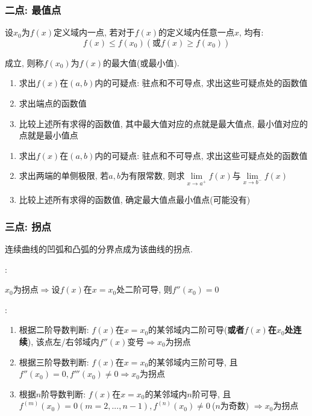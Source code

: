 \subsubsection{二点: 最值点}
设$ x_{0} $为$ f(x) $定义域内一点, 若对于$ f(x) $的定义域内任意一点$ x $, 均有:
\begin{equation*}
    f(x)\le f(x_{0})(\text{或}f(x)\ge f(x_{0}))
\end{equation*}\par
成立, 则称$ f(x_{0}) $为$ f(x) $的最大值(或最小值).\par \vspace{.5em}
\begin{enumerate}
    \item 求出$ f(x) $在$ (a,b) $内的可疑点: 驻点和不可导点, 求出这些可疑点处的函数值
    \item 求出端点的函数值
    \item 比较上述所有求得的函数值, 其中最大值对应的点就是最大值点, 最小值对应的点就是最小值点
\end{enumerate}
\begin{enumerate}
    \item 求出$ f(x) $在$ (a,b) $内的可疑点: 驻点和不可导点, 求出这些可疑点处的函数值
    \item 求出两端的单侧极限, 若$ a,b $为有限常数, 则求$ \lim\limits_{x\rightarrow a^{+}}f(x) $与$ \lim\limits_{x\rightarrow b^{-}}f(x) $
    \item 比较上述所有求得的函数值, 确定最大值点最小值点(可能没有)
\end{enumerate}
\subsubsection{三点: 拐点}
连续曲线的凹弧和凸弧的分界点成为该曲线的拐点.\par \vspace{.5em}
: \par \vspace{.5em}
$ x_{0} $为拐点$ \Rightarrow $设$ f(x) $在$ x=x_{0} $处二阶可导, 则$ f''(x_{0})=0 $ \par \vspace{.5em}
:
\begin{enumerate}
    \item 根据二阶导数判断: $ f(x) $在$ x=x_{0} $的某邻域内二阶可导(\textbf{或者$ f(x) $在$ x_{0} $处连续}), 该点左/右邻域内$ f''(x) $变号$ \Rightarrow x_{0}$为拐点
    \item 根据三阶导数判断: $ f(x) $在$ x=x_{0} $的某邻域内三阶可导, 且$ f''(x_{0})=0, f'''(x_{0})\neq 0 $$ \Rightarrow x_{0}$为拐点
    \item 根据$ n $阶导数判断: $ f(x) $在$ x=x_{0} $的某邻域内$ n $阶可导, 且$ f^{(m)}(x_{0})=0(m=2,...,n-1), f^{(n)}(x_{0})\neq 0\  $($ n $为奇数) $ \Rightarrow x_{0}$为拐点
\end{enumerate}
